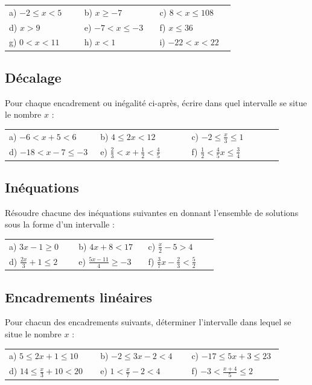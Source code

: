 \documentclass[oneside,12pt]{article}          %
\begin{document}
\renewcommand{\arraystretch}{1.5}
\begin{tabular}{p{0.3\linewidth} p{0.3\linewidth} p{0.3\linewidth}}
	a) $-2\leq x <5$ & b) $x\geq-7$ & c) $8<x\leq108$ \\
	d) $x>9$ & e) $-7<x\leq-3$ & f) $x\leq36$ \\
	g) $0<x<11$ & h) $x<1$ & i) $-22<x<22$
\end{tabular}



\subsection{Décalage}
Pour chaque encadrement ou inégalité ci-après, écrire dans quel intervalle se situe le nombre $x$ :

\begin{tabular}{p{0.3\linewidth} p{0.3\linewidth} p{0.3\linewidth}}
	a) $-6<x+5<6$ & b) $4\leq2x<12$ & c) $-2\leq\frac{x}{3}\leq1$ \\
	d) $-18<x-7\leq-3$ & e) $\frac{2}{3}<x+\frac{1}{2}<\frac{4}{5}$ & f) $\frac{1}{2}<\frac{4}{5}x\leq\frac{3}{4}$
\end{tabular}



\subsection{Inéquations}
Résoudre chacune des inéquations suivantes en donnant l'ensemble de solutions sous la forme d'un intervalle :

\begin{tabular}{p{0.3\linewidth} p{0.3\linewidth} p{0.3\linewidth}}
	a) $3x-1\geq0$ & b) $4x+8<17$ & c) $\frac{x}{2}-5>4$ \\
	d) $\frac{2x}{3}+1\leq 2$ & e) $\frac{5x-11}{4}\geq-3$ & f) $\frac{3}{7}x-\frac{2}{3}<\frac{5}{2}$
\end{tabular}



\subsection{Encadrements linéaires}
Pour chacun des encadrements suivants, déterminer l'intervalle dans lequel se situe le nombre $x$ :

\begin{tabular}{p{0.3\linewidth} p{0.3\linewidth} p{0.3\linewidth}}
	a) $5\leq2x+1\leq10$ & b) $-2\leq3x-2<4$ & c) $-17\leq5x+3\leq23$ \\
	d) $14\leq\frac{x}{3}+10<20$ & e) $1<\frac{x}{7}-2<4$ & f) $-3<\frac{x+4}{5}\leq2$
\end{tabular}
\end{document}
